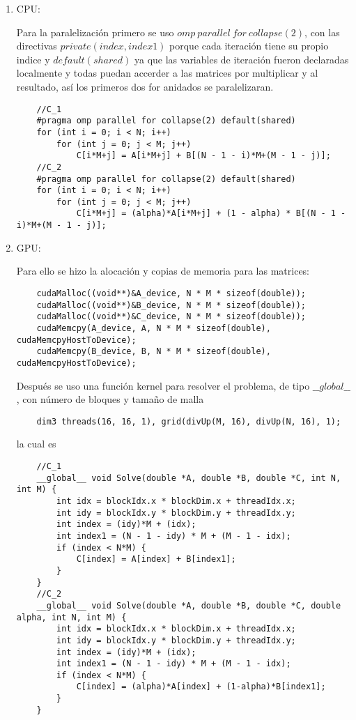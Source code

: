 \documentclass[letterpaper]{article}
\theoremstyle{definition}
\theoremstyle{lemathm}
\theoremstyle{lemathm}
\theoremstyle{lemathm}
\theoremstyle{lemademthm}
\newcommand{\1}{\mathbbm{1}}
\begin{document}
	\begin{enumerate}
		\item CPU:

		Para la paralelización primero se uso $omp\ parallel\ for\ collapse(2)$, con las directivas $private(index, index1)$ porque cada iteración tiene su propio indice y $default(shared)$ ya que las variables de iteración fueron declaradas localmente y todas puedan accerder a las matrices por multiplicar y al resultado, así los primeros dos for anidados se paralelizaran.

		\begin{verbatim}
	//C_1
	#pragma omp parallel for collapse(2) default(shared)
    for (int i = 0; i < N; i++)
        for (int j = 0; j < M; j++)
            C[i*M+j] = A[i*M+j] + B[(N - 1 - i)*M+(M - 1 - j)];
	//C_2
	#pragma omp parallel for collapse(2) default(shared)
    for (int i = 0; i < N; i++)
        for (int j = 0; j < M; j++)
            C[i*M+j] = (alpha)*A[i*M+j] + (1 - alpha) * B[(N - 1 - i)*M+(M - 1 - j)];
		\end{verbatim}

		\item GPU:
		
		Para ello se hizo la alocación y copias de memoria para las matrices:

		\begin{verbatim}
	cudaMalloc((void**)&A_device, N * M * sizeof(double));
	cudaMalloc((void**)&B_device, N * M * sizeof(double));
	cudaMalloc((void**)&C_device, N * M * sizeof(double));
	cudaMemcpy(A_device, A, N * M * sizeof(double), cudaMemcpyHostToDevice);
	cudaMemcpy(B_device, B, N * M * sizeof(double), cudaMemcpyHostToDevice);
		\end{verbatim}

		Después se uso una función kernel para resolver el problema, de tipo $\_\_global\_\_$, con número de bloques y tamaño de malla

		\begin{verbatim}
	dim3 threads(16, 16, 1), grid(divUp(M, 16), divUp(N, 16), 1);
		\end{verbatim}
		
		la cual es

		\begin{verbatim}
	//C_1
	__global__ void Solve(double *A, double *B, double *C, int N, int M) {
		int idx = blockIdx.x * blockDim.x + threadIdx.x;
		int idy = blockIdx.y * blockDim.y + threadIdx.y;
		int index = (idy)*M + (idx);
		int index1 = (N - 1 - idy) * M + (M - 1 - idx);
		if (index < N*M) {
			C[index] = A[index] + B[index1];
		}
	}
	//C_2
	__global__ void Solve(double *A, double *B, double *C, double alpha, int N, int M) {
		int idx = blockIdx.x * blockDim.x + threadIdx.x;
		int idy = blockIdx.y * blockDim.y + threadIdx.y;
		int index = (idy)*M + (idx);
		int index1 = (N - 1 - idy) * M + (M - 1 - idx);
		if (index < N*M) {
			C[index] = (alpha)*A[index] + (1-alpha)*B[index1];
		}
	}
		\end{verbatim}
	\end{enumerate}
\end{document}

